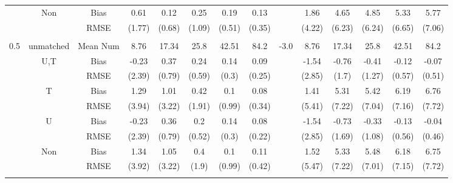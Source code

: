 \begin{tabular}{@{\extracolsep{5pt}}lc|cccccc|lccccc}
 & Non & Bias & 0.61 & 0.12 & 0.25 & 0.19 & 0.13 &  & 1.86 & 4.65 & 4.85 & 5.33 & 5.77 \\
 &  & RMSE & (1.77) & (0.68) & (1.09) & (0.51) & (0.35) &  & (4.22) & (6.23) & (6.24) & (6.65) & (7.06) \\
 &  &  &  &  &  &  &  &  &  &  &  &  &  \\
0.5 & unmatched & Mean Num & 8.76 & 17.34 & 25.8 & 42.51 & 84.2 & -3.0 & 8.76 & 17.34 & 25.8 & 42.51 & 84.2 \\
 & U,T & Bias & -0.23 & 0.37 & 0.24 & 0.14 & 0.09 &  & -1.54 & -0.76 & -0.41 & -0.12 & -0.07 \\
 &  & RMSE & (2.39) & (0.79) & (0.59) & (0.3) & (0.25) &  & (2.85) & (1.7) & (1.27) & (0.57) & (0.51) \\
 & T & Bias & 1.29 & 1.01 & 0.42 & 0.1 & 0.08 &  & 1.41 & 5.31 & 5.42 & 6.19 & 6.76 \\
 &  & RMSE & (3.94) & (3.22) & (1.91) & (0.99) & (0.34) &  & (5.41) & (7.22) & (7.04) & (7.16) & (7.72) \\
 & U & Bias & -0.23 & 0.36 & 0.2 & 0.14 & 0.08 &  & -1.54 & -0.73 & -0.33 & -0.13 & -0.04 \\
 &  & RMSE & (2.39) & (0.79) & (0.52) & (0.3) & (0.22) &  & (2.85) & (1.69) & (1.08) & (0.56) & (0.46) \\
 & Non & Bias & 1.34 & 1.05 & 0.4 & 0.1 & 0.11 &  & 1.52 & 5.33 & 5.48 & 6.18 & 6.75 \\
 &  & RMSE & (3.92) & (3.22) & (1.9) & (0.99) & (0.42) &  & (5.47) & (7.22) & (7.01) & (7.15) & (7.72) \\
 &  &  &  &  &  &  &  &  &  &  &  &  &  \\
\hline 
\bottomrule 
\end{tabular}
